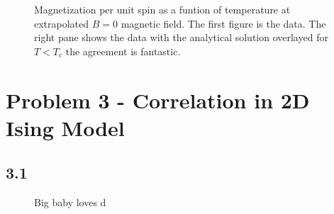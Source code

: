 \documentclass[singlepage,notitlepage,nofootinbib,11pt]{revtex4-1}
\begin{document}
\begin{figure}[h]
  \centering
  \captionsetup[subfigure]{labelformat=empty}
  \caption{\label{merit} Magnetization per unit spin as a funtion of temperature at extrapolated $B=0$ magnetic field. The first figure is the data. The right pane shows the data with the analytical solution overlayed for $T<T_c$ the agreement is fantastic.}
\end{figure}
\clearpage
\section{Problem 3 - Correlation in 2D Ising Model}
\subsection*{3.1}
\begin{figure}[h]
  \centering
  \captionsetup[subfigure]{labelformat=empty}
  \caption{\label{example} Big baby loves d}
\end{figure}
\end{document}
